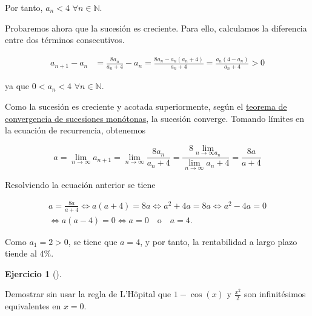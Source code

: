 \documentclass[
  spanish,
  a4paper,
]{scrreport}
\theoremstyle{definition}
\newtheorem{exercise}{Ejercicio}[chapter]
\theoremstyle{remark}
\begin{document}
\begin{tcolorbox}
Por tanto, \(a_n < 4\) \(\forall n\in\mathbb{N}\).

Probaremos ahora que la sucesión es creciente. Para ello, calculamos la
diferencia entre dos términos consecutivos.

\begin{align*}
a_{n+1}-a_n 
&= \frac{8a_n}{a_n+4}-a_n 
= \frac{8a_n-a_n(a_n+4)}{a_n+4} 
= \frac{a_n(4-a_n)}{a_n+4}
> 0
\end{align*}

ya que \(0<a_n<4\) \(\forall n\in\mathbb{N}\).

Como la sucesión es creciente y acotada superiormente, según el
\href{https://aprendeconalf.es/analisis-manual/04-sucesiones.html\#thm-convergencia-monotona}{teorema
de convergencia de sucesiones monótonas}, la sucesión converge. Tomando
límites en la ecuación de recurrencia, obtenemos

\[
a 
= \lim_{n\to\infty} a_{n+1} 
= \lim_{n\to\infty} \frac{8a_n}{a_n+4} 
= \frac{8\lim_{n\to\infty a_n}}{\lim_{n\to\infty} a_n+4}
= \frac{8a}{a+4}
\]

Resolviendo la ecuación anterior se tiene

\[
\begin{gathered}
a = \frac{8a}{a+4} 
\Leftrightarrow a(a+4) = 8a 
\Leftrightarrow a^2+4a = 8a 
\Leftrightarrow a^2-4a = 0 \\
\Leftrightarrow a(a-4) = 0
\Leftrightarrow a = 0 \quad \text{o} \quad a = 4.
\end{gathered}
\]

Como \(a_1 = 2 > 0\), se tiene que \(a = 4\), y por tanto, la
rentabilidad a largo plazo tiende al \(4\%\).

\end{tcolorbox}

\begin{exercise}[]\protect\hypertarget{exr-3}{}\label{exr-3}

Demostrar sin usar la regla de L'Hôpital que \(1 - \cos(x)\) y
\(\frac{x^2}{2}\) son infinitésimos equivalentes en \(x=0\).

\end{exercise}
\end{document}
